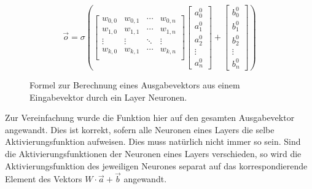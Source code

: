 \documentclass{article}
\begin{document}
\begin{figure}[h]
	\begin{equation*}
		\vec{o} = \sigma\left(
		\begin{bmatrix}
			w_{0,0} & w_{0,1} & \cdots & w_{0,n}\\
			w_{1,0} & w_{1,1} & \cdots & w_{1,n}\\
			\vdots & \vdots & \ddots & \vdots\\
			w_{k,0} & w_{k,1} & \cdots & w_{k,n}\\
		\end{bmatrix}
		\begin{bmatrix}
			a^0_0\\
			a^0_1\\
			a^0_2\\
			\vdots\\
			a^0_n
		\end{bmatrix}
		+
		\begin{bmatrix}
			b^0_0\\
			b^0_1\\
			b^0_2\\
			\vdots\\
			b^0_n
		\end{bmatrix}
		\right)
	\end{equation*}
	\caption{Formel zur Berechnung eines Ausgabevektors aus einem Eingabevektor durch ein Layer Neuronen. }
\end{figure}
\newline
Zur Vereinfachung wurde die Funktion hier auf den gesamten Ausgabevektor angewandt. Dies ist korrekt, sofern alle Neuronen eines Layers die selbe Aktivierungsfunktion aufweisen. Dies muss natürlich nicht immer so sein. Sind die Aktivierungsfunktionen der Neuronen eines Layers verschieden, so wird die Aktivierungsfunktion des jeweiligen Neurones separat auf das korrespondierende Element des Vektors $W\cdot\vec{a}+\vec{b}$ angewandt.
\end{document}
